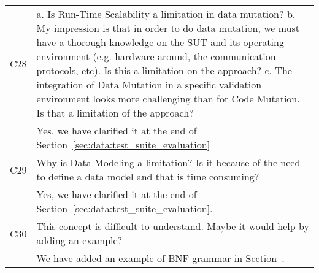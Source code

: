 \begin{longtable}{|p{1.2cm}|p{12cm}|@{}}
\hline
C28&
\begin{minipage}{10cm}
a. Is Run-Time Scalability a limitation in data mutation?
b. My impression is that in order to do data mutation, we must have a thorough knowledge on the SUT and its operating environment (e.g. hardware
around, the communication protocols, etc). Is this a limitation on the approach?
c. The integration of Data Mutation in a specific validation environment looks more challenging than for Code Mutation. Is that a limitation of the
approach?
\end{minipage}
\\
\cmidrule{2-2}
&Yes, we have clarified it at the end of Section~\ref{sec:data:test_suite_evaluation}
\\
\hline
C29&
Why is Data Modeling a limitation? Is it because of the need to define a data model and that is time consuming?
\\
\cmidrule{2-2}
&Yes, we have clarified it at the end of Section~\ref{sec:data:test_suite_evaluation}.
\\
\hline
C30&
This concept is difficult to understand. Maybe it would help by adding an example?
\\
\cmidrule{2-2}
&We have added an example of BNF grammar in Section~\cite{sec:dataModeling}.
\\



\bottomrule                                                             
\end{longtable}
\normalsize

\clearpage